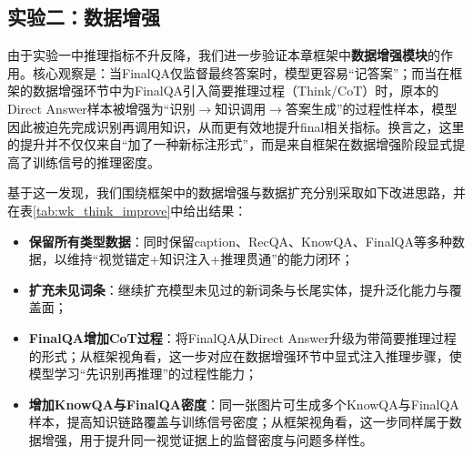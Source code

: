 \begin{table}[htbp]
\centering
\small
\renewcommand{\arraystretch}{1.3}
\caption{实验一：Part1数据与不同数据类型配置的消融结果（Chinese SimpleVQA）。Rec表示Recognition；Acc表示Accuracy；Part1表示第一批数据；all表示全部类型数据；e表示训练轮次；RKF分别表示RecQA、KnowQA与FinalQA。}
\label{tab:wk_ablation_part1}
\end{table}

\subsection{实验二：数据增强}
由于实验一中推理指标不升反降，我们进一步验证本章框架中\textbf{数据增强模块}的作用。核心观察是：当FinalQA仅监督最终答案时，模型更容易“记答案”；而当在框架的数据增强环节中为FinalQA引入简要推理过程（Think/CoT）\citep{wei2022chain}时，原本的Direct Answer样本被增强为“识别$\rightarrow$知识调用$\rightarrow$答案生成”的过程性样本，模型因此被迫先完成识别再调用知识，从而更有效地提升final相关指标。换言之，这里的提升并不仅仅来自“加了一种新标注形式”，而是来自框架在数据增强阶段显式提高了训练信号的推理密度。

基于这一发现，我们围绕框架中的数据增强与数据扩充分别采取如下改进思路，并在表\ref{tab:wk_think_improve}中给出结果：
\begin{itemize}
  \item \textbf{保留所有类型数据}：同时保留caption、RecQA、KnowQA、FinalQA等多种数据，以维持“视觉锚定+知识注入+推理贯通”的能力闭环；
  \item \textbf{扩充未见词条}：继续扩充模型未见过的新词条与长尾实体，提升泛化能力与覆盖面；
  \item \textbf{FinalQA增加CoT过程}：将FinalQA从Direct Answer升级为带简要推理过程的形式；从框架视角看，这一步对应在数据增强环节中显式注入推理步骤，使模型学习“先识别再推理”的过程性能力；
  \item \textbf{增加KnowQA与FinalQA密度}：同一张图片可生成多个KnowQA与FinalQA样本，提高知识链路覆盖与训练信号密度；从框架视角看，这一步同样属于数据增强，用于提升同一视觉证据上的监督密度与问题多样性。
\end{itemize}

